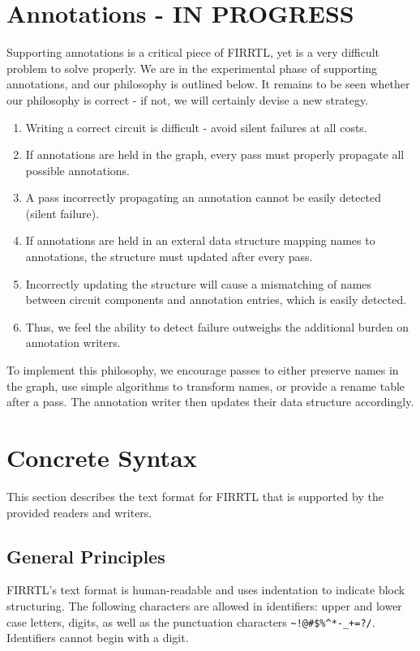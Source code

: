 \documentclass[12pt]{article}
\begin{document}
\section{Annotations - IN PROGRESS}
Supporting annotations is a critical piece of FIRRTL, yet is a very difficult problem to solve properly.
We are in the experimental phase of supporting annotations, and our philosophy is outlined below.
It remains to be seen whether our philosophy is correct - if not, we will certainly devise a new strategy.

\begin{enumerate}[topsep=3pt,itemsep=-0.5ex,partopsep=1ex,parsep=1ex]
\item Writing a correct circuit is difficult - avoid silent failures at all costs.
\item If annotations are held in the graph, every pass must properly propagate all possible annotations.
\item A pass incorrectly propagating an annotation cannot be easily detected (silent failure).
\item If annotations are held in an exteral data structure mapping names to annotations, the structure must updated after every pass.
\item Incorrectly updating the structure will cause a mismatching of names between circuit components and annotation entries, which is easily detected.
\item Thus, we feel the ability to detect failure outweighs the additional burden on annotation writers.
\end{enumerate}

To implement this philosophy, we encourage passes to either preserve names in the graph, use simple algorithms to transform names, or provide a rename table after a pass.
The annotation writer then updates their data structure accordingly.

\section{Concrete Syntax}\label{concrete}
This section describes the text format for FIRRTL that is supported by the provided readers and writers.

\subsection*{General Principles}
FIRRTL's text format is human-readable and uses indentation to indicate block structuring.
The following characters are allowed in identifiers: upper and lower case letters, digits, as well as the punctuation characters \verb|~!@#$%^*-_+=?/|.
Identifiers cannot begin with a digit. 
\end{document}

